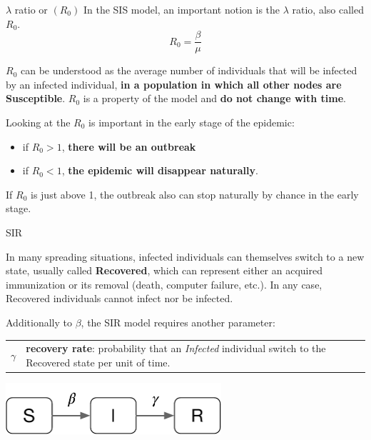 \documentclass[a4paper,11pt]{book}
\begin{document}
\begin{textbox}{$\lambda$ ratio or $(R_0)$}
In the SIS model, an important notion is the $\lambda$ ratio, also called $R_0$. 
\[
R_0=\frac{\beta}{\mu}
\]

$R_0$ can be understood as the average number of individuals that will be infected by an infected individual, \textbf{in a population in which all other nodes are Susceptible}. $R_0$ is a property of the model and \textbf{do not change with time}.

Looking at the $R_0$ is important in the early stage of the epidemic: 
\begin{itemize}
    \item if $R_0>1$, \textbf{there will be an outbreak}
    \item if $R_0<1$, \textbf{the epidemic will disappear naturally}.
\end{itemize}

If $R_0$ is just above 1, the outbreak also can stop naturally by chance in the early stage.
\end{textbox}
















\begin{textbox}{SIR}

In many spreading situations, infected individuals can themselves switch to a new state, usually called \textbf{Recovered}, which can represent either an acquired immunization or its removal (death, computer failure, etc.). In any case, Recovered individuals cannot infect nor be infected.

Additionally to $\beta$, the SIR model requires another parameter:

\begin{tabular}{p{}|p{}}\scriptsize

$\gamma$ & \textbf{recovery rate}: probability that an \textit{Infected} individual switch to the Recovered state per unit of time.
\end{tabular}
\centering
\vspace{0.3cm}
\includegraphics[width=0.6\textwidth]{pics/SIR.pdf}
\end{textbox}
\end{document}
